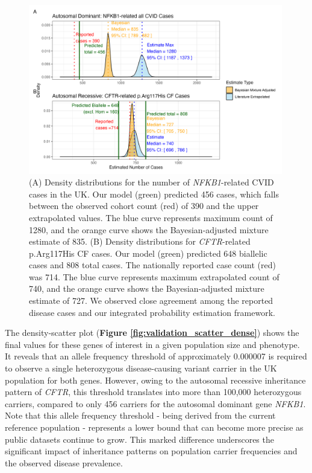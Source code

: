 \begin{figure}[ht]
  \centering
  \includegraphics[width=0.99\textwidth]{../images/validation_studies_bayesian_adjusted_estimates.png}
  \caption{(A) Density distributions for the number of \textit{NFKB1}-related CVID cases in the UK. 
  Our model (green) predicted 456 cases, which falls between the observed cohort count (red) of 390 and the upper extrapolated values.
  The blue curve represents maximum count of 1280, and the orange curve shows the Bayesian-adjusted mixture estimate of 835. 
(B) Density distributions for \textit{CFTR}-related p.Arg117His CF cases. 
Our model (green) predicted 648 biallelic cases and 808 total cases.
The nationally reported case count (red) was 714.
The blue curve represents maximum extrapolated count of 740, and the orange curve shows the Bayesian-adjusted mixture estimate of 727. We observed close agreement among the reported disease cases and our integrated probability estimation framework.}
  \label{fig:validation_studies_bayesian_adjusted_estimates}
\end{figure}

The density-scatter plot (\textbf{Figure \ref{fig:validation_scatter_dense}}) shows the final values for these genes of interest in a given population size and phenotype. It reveals that an allele frequency threshold of approximately 0.000007 is required to observe a single heterozygous disease-causing variant carrier in the UK population for both genes. However, owing to the autosomal recessive inheritance pattern of \textit{CFTR}, this threshold translates into more than 100,000 heterozygous carriers, compared to only 456 carriers for the autosomal dominant gene \textit{NFKB1}. Note that this allele frequency threshold - being derived from the current reference population - represents a lower bound that can become more precise as public datasets continue to grow. This marked difference underscores the significant impact of inheritance patterns on population carrier frequencies and the observed disease prevalence.

